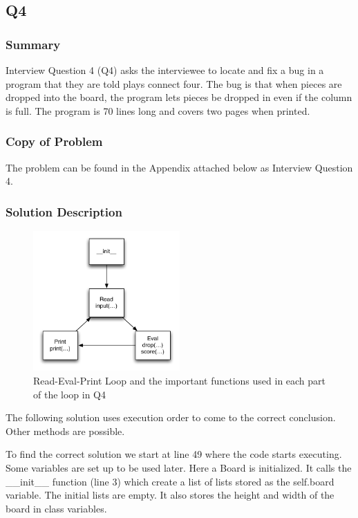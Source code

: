 \newpage
\subsection{Q4}
\subsubsection{Summary}
Interview Question 4 (Q4) asks the interviewee to locate and fix a bug in a program that they are told plays connect four.
The bug is that when pieces are dropped into the board, the program lets pieces be dropped in even if the column is full.
The program is 70 lines long and covers two pages when printed.
\subsubsection{Copy of Problem}
The problem can be found in the Appendix attached below as Interview Question 4.

\subsubsection{Solution Description}
\begin{figure}[t]
\centering
\includegraphics[width=0.5\textwidth]{Q4diagram.pdf}
\caption{Read-Eval-Print Loop and the important functions used in each part of the loop in Q4}
\label{fig-q2}
\end{figure}

The following solution uses execution order to come to the correct conclusion. Other methods are possible. 

To find the correct solution we start at line 49 where the code starts executing.
Some variables are set up to be used later. 
Here a Board is initialized.
It calls the \_\_init\_\_ function (line 3) which create a list of lists stored as the self.board variable.
The initial lists are empty.
It also stores the height and width of the board in class variables. \\

